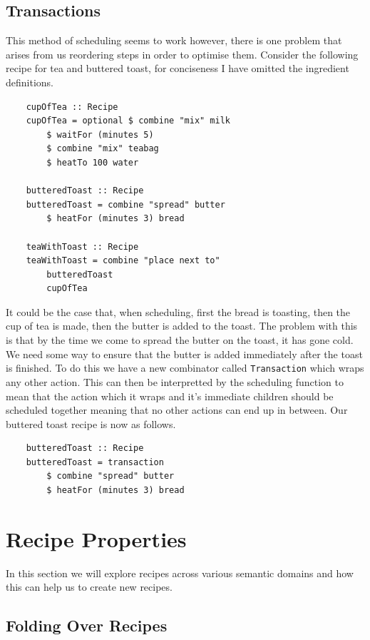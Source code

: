 \documentclass[11pt]{article}
\begin{document}
\subsection{Transactions}

This method of scheduling seems to work however, there is one problem that arises from us
reordering steps in order to optimise them. Consider the following recipe for tea and buttered toast,
for conciseness I have omitted the ingredient definitions.

\begin{lstlisting}
    cupOfTea :: Recipe
    cupOfTea = optional $ combine "mix" milk
        $ waitFor (minutes 5)
        $ combine "mix" teabag
        $ heatTo 100 water

    butteredToast :: Recipe
    butteredToast = combine "spread" butter
        $ heatFor (minutes 3) bread

    teaWithToast :: Recipe
    teaWithToast = combine "place next to"
        butteredToast
        cupOfTea
\end{lstlisting}

It could be the case that, when scheduling, first the bread is toasting, then the cup of tea is
made, then the butter is added to the toast. The problem with this is that by the time we come
to spread the butter on the toast, it has gone cold. We need some way to ensure that the butter
is added immediately after the toast is finished. To do this we have a new combinator called
\texttt{Transaction} which wraps any other action. This can then be interpretted by the scheduling
function to mean that the action which it wraps and it's immediate children should be scheduled
together meaning that no other actions can end up in between. Our buttered toast recipe is now
as follows.

\begin{lstlisting}
    butteredToast :: Recipe
    butteredToast = transaction
        $ combine "spread" butter
        $ heatFor (minutes 3) bread
\end{lstlisting}

\section{Recipe Properties}

In this section we will explore recipes across various semantic domains and how this can
help us to create new recipes.

\subsection{Folding Over Recipes}
\end{document}
